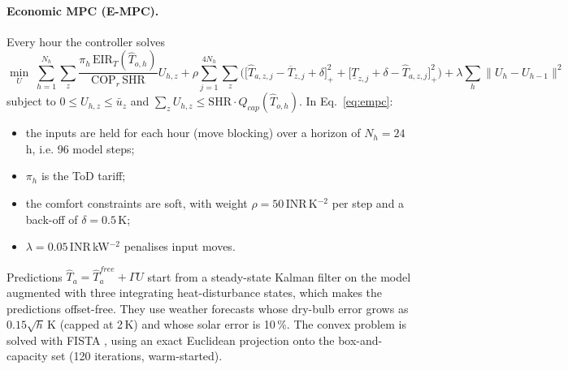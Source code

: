 \paragraph{Economic MPC (E-MPC).}
Every hour the controller solves
\begin{equation}
\min_{U}\;\sum_{h=1}^{N_h}\sum_{z}\frac{\pi_h\,\mathrm{EIR}_T(\hat T_{o,h})}{\mathrm{COP}_r\,\mathrm{SHR}}U_{h,z}
+\rho\sum_{j=1}^{4N_h}\sum_z\Big(\big[\hat T_{a,z,j}-\overline T_{z,j}+\delta\big]_+^2+\big[\underline T_{z,j}+\delta-\hat T_{a,z,j}\big]_+^2\Big)
+\lambda\sum_h\|U_h-U_{h-1}\|^2 \label{eq:empc}
\end{equation}
subject to $0\le U_{h,z}\le\bar u_z$ and $\sum_z U_{h,z}\le \mathrm{SHR}\cdot Q_{cap}(\hat T_{o,h})$.
In Eq.~\eqref{eq:empc}:
\begin{itemize}
  \item the inputs are held for each hour (move blocking) over a horizon of
        $N_h=24$\,h, i.e. 96 model steps;
  \item $\pi_h$ is the ToD tariff;
  \item the comfort constraints are soft, with weight $\rho=50$\,INR\,K$^{-2}$ per step
        and a back-off of $\delta=0.5$\,K;
  \item $\lambda=0.05$\,INR\,kW$^{-2}$ penalises input moves.
\end{itemize}
Predictions $\hat T_a=\hat T_a^{free}+\Gamma U$ start from a steady-state Kalman filter
on the model augmented with three integrating heat-disturbance states, which makes the
predictions offset-free. They use weather forecasts whose dry-bulb error grows as
$0.15\sqrt{h}$\,K (capped at 2\,K) and whose solar error is 10\,\%. The convex problem
is solved with FISTA \cite{beck2009}, using an exact Euclidean projection onto the
box-and-capacity set (120 iterations, warm-started).

